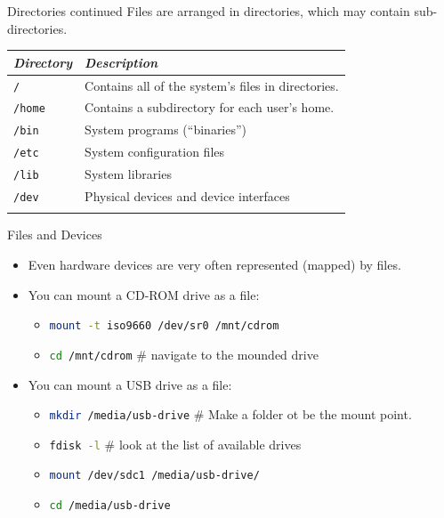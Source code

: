 \documentclass[14pt,aspectratio=1610]{beamer}
\begin{document}
\begin{frame}{Directories continued}
Files are arranged in directories, which may contain sub-directories.

\begin{tabularx}{1\textwidth}{l X}
\toprule{}%
  \emph{Directory} & \emph{Description}\\
\midrule{}%
  \texttt{/} & Contains all of the system's files in directories.\\
  \texttt{/home} &  Contains a subdirectory for each user's home.\\
  \texttt{/bin}  &  System programs (``binaries'')\\
  \texttt{/etc}  &  System configuration files\\
  \texttt{/lib}  &  System libraries\\
  \texttt{/dev}  &  Physical devices and device interfaces\\
\bottomrule{}
\end{tabularx}

\end{frame}


\begin{frame}{Files and Devices}
\begin{itemize}
  \item Even hardware devices are very often represented (mapped) by files.
  \item You can mount a CD-ROM drive as a file:
    \begin{itemize}
      \item \lstinline[language=Bash, morekeywords=mount]{mount -t iso9660 /dev/sr0 /mnt/cdrom}
      \item \lstinline[language=Bash]{cd /mnt/cdrom} \# navigate to the mounded drive
    \end{itemize}\vspace{1em}
    \item You can mount a USB drive as a file:
    \begin{itemize}
      \item \lstinline[language=Bash, morekeywords=mkdir]{mkdir /media/usb-drive} \# Make a folder ot be the mount point.
      \item \lstinline[language=Bash, morekeywords=fdisk]{fdisk -l} \# look at the list of available drives
      \item \lstinline[language=Bash, morekeywords=mount]{mount /dev/sdc1 /media/usb-drive/}
      \item \lstinline[language=Bash]{cd /media/usb-drive}
    \end{itemize}
\end{itemize}
\end{frame}
\end{document}

